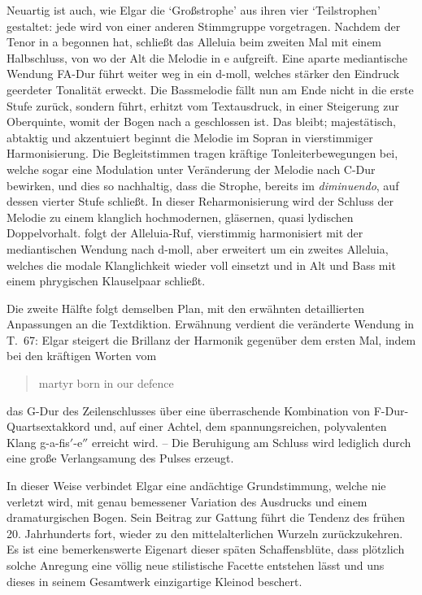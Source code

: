 \documentclass[a4paper,11pt,open=any]{scrbook}
\newcommand{\engquote}[1]{\foreignblockquote{english}{#1}}
\begin{document}
Neuartig ist auch, wie Elgar die \enquote*{Großstrophe} aus ihren
vier \enquote*{Teilstrophen} gestaltet: jede wird von einer anderen
Stimmgruppe vorgetragen.  Nachdem der Tenor in \textsf{a} begonnen hat,
schließt das Alleluia beim zweiten Mal mit einem Halbschluss, von wo der
Alt die Melodie in \textsf{e} aufgreift.  Eine aparte mediantische Wendung
F\textrightarrow{}A-Dur führt weiter weg in ein d-moll, welches stärker den
Eindruck geerdeter Tonalität erweckt.  Die Bassmelodie fällt nun am Ende
nicht in die erste Stufe zurück, sondern führt, erhitzt vom Textausdruck,
in einer Steigerung zur Oberquinte, womit der Bogen nach \textsf{a}
geschlossen ist.  Das  bleibt; majestätisch, abtaktig
und akzentuiert beginnt die Melodie im Sopran in vierstimmiger
Harmonisierung.  Die Begleitstimmen tragen kräftige Tonleiterbewegungen
bei, welche sogar eine Modulation unter Veränderung der Melodie nach
C-Dur bewirken, und dies so nachhaltig, dass die Strophe, bereits im
\textit{diminuendo}, auf dessen vierter Stufe schließt.  In dieser
Reharmonisierung wird der Schluss der Melodie zu einem klanglich hochmodernen,
gläsernen, quasi lydischen Doppelvorhalt.   folgt der
Alleluia-Ruf, vierstimmig harmonisiert mit der mediantischen Wendung
nach d-moll, aber erweitert um ein zweites Alleluia, welches die modale
Klanglichkeit wieder voll einsetzt und in Alt und Bass mit einem phrygischen
Klauselpaar schließt.

Die zweite Hälfte folgt demselben Plan, mit den erwähnten detaillierten
Anpassungen an die Textdiktion.  Erwähnung verdient die veränderte Wendung
in T.~67: Elgar steigert die Brillanz der Harmonik gegenüber dem ersten
Mal, indem bei den kräftigen Worten vom \engquote{martyr born in our defence}
das G-Dur des Zeilenschlusses über eine überraschende Kombination von
F-Dur-Quartsextakkord und, auf einer Achtel, dem spannungsreichen, polyvalenten
Klang \textsf{g-a-fis$'$-e$''$} erreicht wird. – Die Beruhigung am Schluss
wird lediglich durch eine große Verlangsamung des Pulses erzeugt.

In dieser Weise verbindet Elgar eine andächtige Grundstimmung, welche
nie verletzt wird, mit genau bemessener Variation des Ausdrucks und
einem dramaturgischen Bogen.  Sein Beitrag zur Gattung führt die
Tendenz des frühen 20. Jahrhunderts fort, wieder zu den mittelalterlichen
Wurzeln zurückzukehren.  Es ist eine bemerkenswerte Eigenart dieser späten
Schaffensblüte, dass plötzlich solche Anregung eine völlig neue stilistische
Facette entstehen lässt und uns dieses in seinem Gesamtwerk einzigartige
Kleinod beschert.
\end{document}

